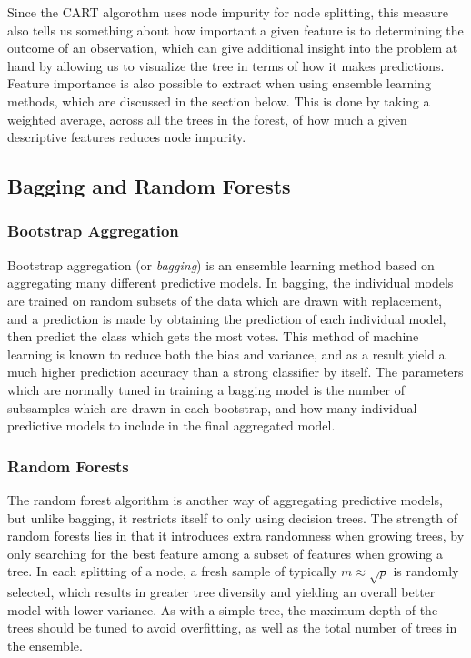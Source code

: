  Since the CART algorothm uses node impurity for node splitting, this measure also tells us something about how important a given feature is to determining the outcome of an observation, which can give additional insight into the problem at hand by allowing us to visualize the tree in terms of how it makes predictions. Feature importance is also possible to extract when using ensemble learning methods, which are discussed in the section below. This is done by taking a weighted average, across all the trees in the forest, of how much a given descriptive features reduces node impurity.


\subsection{Bagging and Random Forests}
\subsubsection{Bootstrap Aggregation}
Bootstrap aggregation (or \textit{bagging}) is an ensemble learning method based on aggregating many different predictive models. In bagging, the individual models are trained on random subsets of the data which are drawn with replacement, and a prediction is made by obtaining the prediction of each individual model, then predict the class which gets the most votes. This method of machine learning is known to reduce both the bias and variance, and as a result yield a much higher prediction accuracy than a strong classifier by itself. The parameters which are normally tuned in training a bagging model is the number of subsamples which are drawn in each bootstrap, and how many individual predictive models to include in the final aggregated model. 

\subsubsection{Random Forests}
The random forest algorithm is another way of aggregating predictive models, but unlike bagging, it restricts itself to only using decision trees. The strength of random forests lies in that it introduces extra randomness when growing trees, by only searching for the best feature among a subset of features when growing a tree. In each splitting of a node, a fresh sample of typically $m \approx \sqrt{p}$ is randomly selected, which results in greater tree diversity and yielding an overall better model with lower variance. As with a simple tree, the maximum depth of the trees should be tuned to avoid overfitting, as well as the total number of trees in the ensemble.

